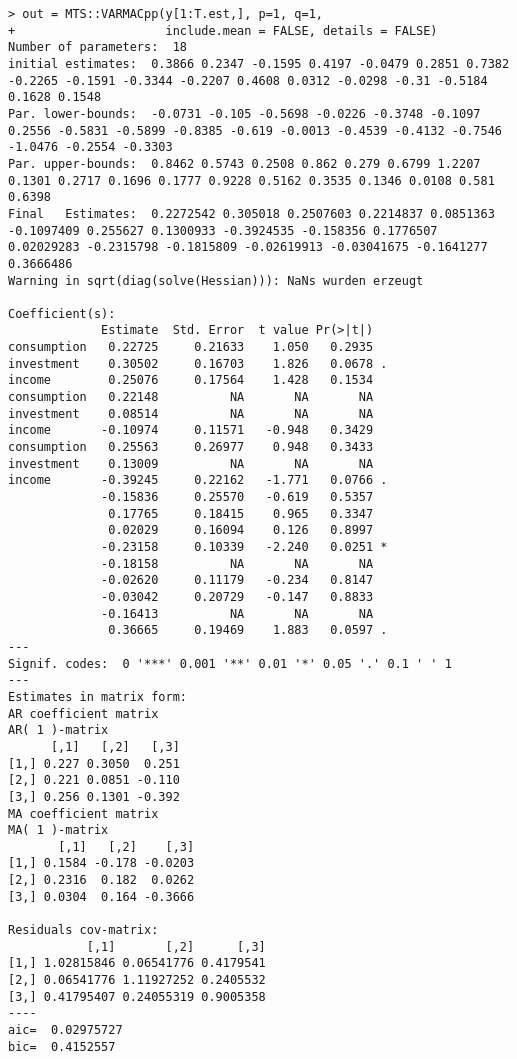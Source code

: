 \documentclass[]{article}
\begin{document}
\begin{verbatim}
> out = MTS::VARMACpp(y[1:T.est,], p=1, q=1, 
+                     include.mean = FALSE, details = FALSE)
Number of parameters:  18 
initial estimates:  0.3866 0.2347 -0.1595 0.4197 -0.0479 0.2851 0.7382 -0.2265 -0.1591 -0.3344 -0.2207 0.4608 0.0312 -0.0298 -0.31 -0.5184 0.1628 0.1548 
Par. lower-bounds:  -0.0731 -0.105 -0.5698 -0.0226 -0.3748 -0.1097 0.2556 -0.5831 -0.5899 -0.8385 -0.619 -0.0013 -0.4539 -0.4132 -0.7546 -1.0476 -0.2554 -0.3303 
Par. upper-bounds:  0.8462 0.5743 0.2508 0.862 0.279 0.6799 1.2207 0.1301 0.2717 0.1696 0.1777 0.9228 0.5162 0.3535 0.1346 0.0108 0.581 0.6398 
Final   Estimates:  0.2272542 0.305018 0.2507603 0.2214837 0.0851363 -0.1097409 0.255627 0.1300933 -0.3924535 -0.158356 0.1776507 0.02029283 -0.2315798 -0.1815809 -0.02619913 -0.03041675 -0.1641277 0.3666486 
Warning in sqrt(diag(solve(Hessian))): NaNs wurden erzeugt

Coefficient(s):
             Estimate  Std. Error  t value Pr(>|t|)  
consumption   0.22725     0.21633    1.050   0.2935  
investment    0.30502     0.16703    1.826   0.0678 .
income        0.25076     0.17564    1.428   0.1534  
consumption   0.22148          NA       NA       NA  
investment    0.08514          NA       NA       NA  
income       -0.10974     0.11571   -0.948   0.3429  
consumption   0.25563     0.26977    0.948   0.3433  
investment    0.13009          NA       NA       NA  
income       -0.39245     0.22162   -1.771   0.0766 .
             -0.15836     0.25570   -0.619   0.5357  
              0.17765     0.18415    0.965   0.3347  
              0.02029     0.16094    0.126   0.8997  
             -0.23158     0.10339   -2.240   0.0251 *
             -0.18158          NA       NA       NA  
             -0.02620     0.11179   -0.234   0.8147  
             -0.03042     0.20729   -0.147   0.8833  
             -0.16413          NA       NA       NA  
              0.36665     0.19469    1.883   0.0597 .
---
Signif. codes:  0 '***' 0.001 '**' 0.01 '*' 0.05 '.' 0.1 ' ' 1
--- 
Estimates in matrix form: 
AR coefficient matrix 
AR( 1 )-matrix 
      [,1]   [,2]   [,3]
[1,] 0.227 0.3050  0.251
[2,] 0.221 0.0851 -0.110
[3,] 0.256 0.1301 -0.392
MA coefficient matrix 
MA( 1 )-matrix 
       [,1]   [,2]    [,3]
[1,] 0.1584 -0.178 -0.0203
[2,] 0.2316  0.182  0.0262
[3,] 0.0304  0.164 -0.3666
  
Residuals cov-matrix: 
           [,1]       [,2]      [,3]
[1,] 1.02815846 0.06541776 0.4179541
[2,] 0.06541776 1.11927252 0.2405532
[3,] 0.41795407 0.24055319 0.9005358
---- 
aic=  0.02975727 
bic=  0.4152557 
\end{verbatim}
\end{document}
